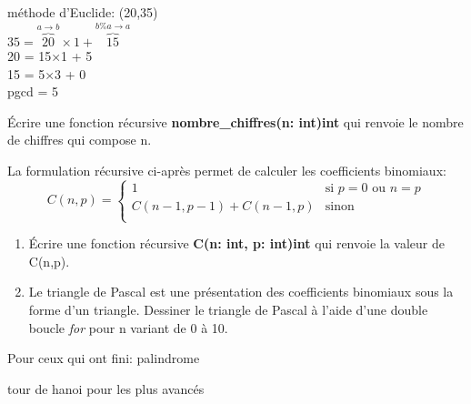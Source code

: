 \documentclass[a4paper,11pt]{article}
\begin{document}
\begin{Form}
\begin{exo}
\begin{commentprof}
méthode d'Euclide: (20,35)\\
$35 = \overbrace{20}^{a\rightarrow b}×1 + \overbrace{15}^{b\%a\rightarrow a}$\\
20 = 15×1 + 5\\
15 = 5×3 + 0\\
pgcd = 5
\end{commentprof}
\end{exo}
\begin{exo}
Écrire une fonction récursive \textbf{nombre\_chiffres(n: int)\;\rightarrow\;int} qui renvoie le nombre de chiffres qui compose n.
\end{exo}
\begin{exo}
La formulation récursive ci-après permet de calculer les coefficients binomiaux:
$$
C(n,p) = \left\{
    \begin{array}{ll}
        1 & \mbox{si } p=0 \mbox{ ou } n=p\\
        C(n-1,p-1)+C(n-1,p) & \mbox{sinon}\\
    \end{array}
\right.
$$
\begin{enumerate}
\item Écrire une fonction récursive \textbf{C(n: int, p: int)\;\rightarrow\;int} qui renvoie la valeur de C(n,p).
\item Le triangle de Pascal est une présentation des coefficients binomiaux sous la forme d'un triangle. Dessiner le triangle de Pascal à l'aide d'une double boucle \emph{for} pour n variant de 0 à 10.
\end{enumerate}
\end{exo}
\begin{commentprof}
Pour ceux qui ont fini: palindrome

\end{commentprof}
\begin{commentprof}
tour de hanoi pour les plus avancés
\end{commentprof}
\end{Form}
\end{document}

